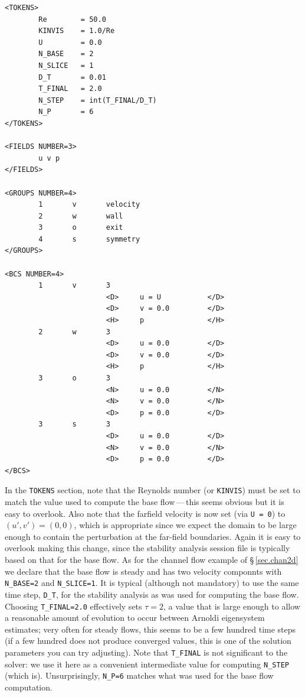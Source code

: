 \documentclass[11pt,a4paper]{report}
\begin{document}
{\small
\begin{verbatim}
<TOKENS>
        Re        = 50.0
        KINVIS    = 1.0/Re
        U         = 0.0
        N_BASE    = 2
        N_SLICE   = 1
        D_T       = 0.01
        T_FINAL   = 2.0
        N_STEP    = int(T_FINAL/D_T)
        N_P       = 6
</TOKENS>

<FIELDS NUMBER=3>
        u v p
</FIELDS>

<GROUPS NUMBER=4>
        1       v       velocity
        2       w       wall
        3       o       exit
        4       s       symmetry
</GROUPS>

<BCS NUMBER=4>
        1       v       3
                        <D>     u = U           </D>
                        <D>     v = 0.0         </D>
                        <H>     p               </H>
        2       w       3
                        <D>     u = 0.0         </D>
                        <D>     v = 0.0         </D>
                        <H>     p               </H>
        3       o       3
                        <N>     u = 0.0         </N>
                        <N>     v = 0.0         </N>
                        <D>     p = 0.0         </D>
        3       s       3
                        <D>     u = 0.0         </D>
                        <N>     v = 0.0         </N>
                        <D>     p = 0.0         </D>
</BCS>
\end{verbatim}
}
\noindent
In the \verb+TOKENS+ section, note that the Reynolds number (or
\verb+KINVIS+) must be set to match the value used to compute the base
flow\,---\,this seems obvious but it is easy to overlook. Also note
that the farfield velocity is now set (via \verb+U = 0+) to
$(u',v')=(0,0)$, which is appropriate since we expect the domain to
be large enough to contain the perturbation at the far-field
boundaries. Again it is easy to overlook making this change, since the
stability analysis session file is typically based on that for the
base flow.  As for the channel flow example of \S\,\ref{sec.chan2d} we
declare that the base flow is steady and has two velocity componnts
with \verb+N_BASE=2+ and \verb+N_SLICE=1+. It is typical (although
not mandatory) to use the same time step, \verb+D_T+, for the
stability analysis as was used for computing the base flow. Choosing
\verb+T_FINAL=2.0+ effectively sets $\tau=2$, a value that is large
enough to allow a reasonable amount of evolution to occur between
Arnoldi eigensystem estimates; very often for steady flows, this seems
to be a few hundred time steps (if a few hundred does not produce
converged values, this is one of the solution parameters you can try
adjusting).  Note that \verb+T_FINAL+ is not significant to the
solver: we use it here as a convenient intermediate value for
computing \verb+N_STEP+ (which is).  Unsurprisingly, \verb+N_P=6+
matches what was used for the base flow computation.
\end{document}
